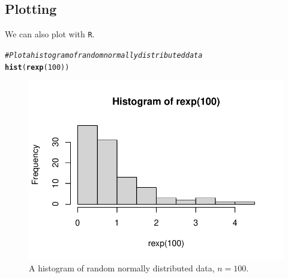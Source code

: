\documentclass{article}\usepackage[]{graphicx}\usepackage[]{xcolor}
\makeatletter
\def\maxwidth{ %
  \ifdim\Gin@nat@width>\linewidth
    \linewidth
  \else
    \Gin@nat@width
  \fi
}
\newcommand{\hlnum}[1]{\textcolor[rgb]{0.686,0.059,0.569}{#1}}%
\newcommand{\hlcom}[1]{\textcolor[rgb]{0.678,0.584,0.686}{\textit{#1}}}%
\newcommand{\hldef}[1]{\textcolor[rgb]{0.345,0.345,0.345}{#1}}%
\newcommand{\hlkwd}[1]{\textcolor[rgb]{0.737,0.353,0.396}{\textbf{#1}}}%
\newenvironment{kframe}{%
 \def\at@end@of@kframe{}%
 \ifinner\ifhmode%
  \def\at@end@of@kframe{\end{minipage}}%
  \begin{minipage}{\columnwidth}%
 \fi\fi%
 \def\FrameCommand##1{\hskip\@totalleftmargin \hskip-\fboxsep
 \colorbox{shadecolor}{##1}\hskip-\fboxsep
     \hskip-\linewidth \hskip-\@totalleftmargin \hskip\columnwidth}%
 \MakeFramed {\advance\hsize-\width
   \@totalleftmargin\z@ \linewidth\hsize
   \@setminipage}}%
 {\par\unskip\endMakeFramed%
 \at@end@of@kframe}
\newenvironment{knitrout}{}{} %
\makeatother
\begin{document}
\begin{multicols}{2}
\subsection{Plotting}
We can also plot with \texttt{R}.
\begin{knitrout}\scriptsize
{}\color{fgcolor}\begin{kframe}
\begin{alltt}
\hlcom{#Plot a histogram of random normally distributed data}
\hlkwd{hist}\hldef{(}\hlkwd{rexp}\hldef{(}\hlnum{100}\hldef{))}
\end{alltt}
\end{kframe}
\end{knitrout}
\begin{figure}[H]
 \begin{center}
\begin{knitrout}
\color{fgcolor}
\includegraphics[width=\maxwidth]{figure/unnamed-chunk-6-1} 
\end{knitrout}
 \caption{A histogram of random normally distributed data, $n=100$.}
 \label{plot1} %
 \end{center}
\end{figure}
\columnbreak 


\end{multicols}
\end{document}
